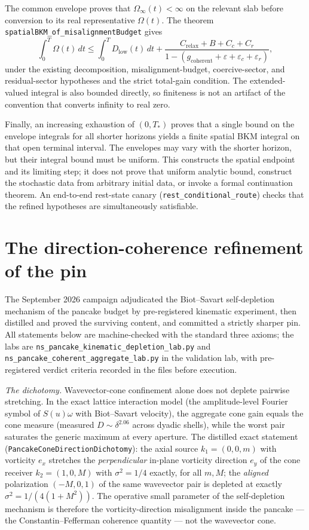 \documentclass[11pt]{article}
\theoremstyle{definition}
\begin{document}
The common envelope proves that $\Omega_\infty(t)<\infty$ on the relevant
slab before conversion to its real representative $\Omega(t)$.  The theorem
\texttt{spatialBKM\_of\_misalignmentBudget} gives
\[
 \int_0^T\Omega(t)\,dt
 \leq \int_0^T D_{\mathrm{low}}(t)\,dt+
 \frac{C_{\mathrm{relax}}+B+C_c+C_r}
 {1-(g_{\mathrm{coherent}}+\varepsilon+\varepsilon_c+\varepsilon_r)},
\]
under the existing decomposition, misalignment-budget, coercive-sector,
and residual-sector hypotheses and the strict total-gain condition.
The extended-valued integral is also bounded directly, so finiteness is
not an artifact of the convention that converts infinity to real zero.

Finally, an increasing exhaustion of $(0,T_*)$ proves that a single bound
on the envelope integrals for all shorter horizons yields a finite spatial
BKM integral on that open terminal interval.  The envelopes may vary with
the shorter horizon, but their integral bound must be uniform.  This
constructs the spatial endpoint and its limiting step; it does not prove
that uniform analytic bound, construct the stochastic data from arbitrary
initial data, or invoke a formal continuation theorem.
An end-to-end rest-state canary
(\texttt{rest\_conditional\_route}) checks that the refined hypotheses are
simultaneously satisfiable.

\section{The direction-coherence refinement of the pin}
\label{sec:coherence}

The September 2026 campaign adjudicated the Biot--Savart self-depletion
mechanism of the pancake budget by pre-registered kinematic experiment,
then distilled and proved the surviving content, and committed a
strictly sharper pin.  All statements below are machine-checked with
the standard three axioms; the labs are
\texttt{ns\_pancake\_kinematic\_depletion\_lab.py} and
\texttt{ns\_pancake\_coherent\_aggregate\_lab.py} in the validation lab,
with pre-registered verdict criteria recorded in the files before
execution.

\emph{The dichotomy.}  Wavevector-cone confinement alone does not
deplete pairwise stretching.  In the exact lattice interaction model
(the amplitude-level Fourier symbol of $S(u)\omega$ with Biot--Savart
velocity), the aggregate cone gain equals the cone measure (measured
$D \sim \delta^{2.06}$ across dyadic shells), while the worst pair
saturates the generic maximum at every aperture.  The distilled exact
statement (\texttt{PancakeConeDirectionDichotomy}): the axial source
$k_1=(0,0,m)$ with vorticity $e_x$ stretches the \emph{perpendicular}
in-plane vorticity direction $e_y$ of the cone receiver $k_2=(1,0,M)$
with $\sigma^2 = 1/4$ exactly, for all $m, M$; the \emph{aligned}
polarization $(-M,0,1)$ of the same wavevector pair is depleted at
exactly $\sigma^2 = 1/(4(1+M^2))$.  The operative small parameter of
the self-depletion mechanism is therefore the vorticity-direction
misalignment inside the pancake --- the Constantin--Fefferman coherence
quantity --- not the wavevector cone.
\end{document}
